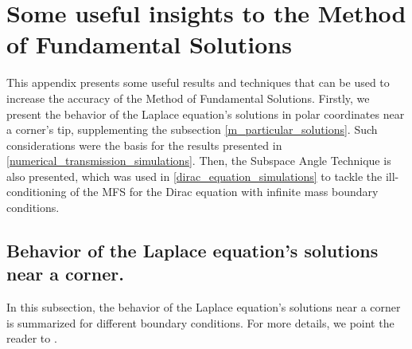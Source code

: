 \chapter{Some useful insights to the Method of Fundamental Solutions}
\label{chapter:appendixB}

This appendix presents some useful results and techniques that can be used to increase the accuracy of the Method of Fundamental Solutions. Firstly, we present the behavior of the Laplace equation's solutions in polar coordinates near a corner's tip, supplementing the subsection \ref{m_particular_solutions}. Such considerations were the basis for the results presented in \ref{numerical_transmission_simulations}. Then, the Subspace Angle Technique is also presented, which was used in \ref{dirac_equation_simulations} to tackle the ill-conditioning of the \ac{MFS} for the Dirac equation with infinite mass boundary conditions.

\section{Behavior of the Laplace equation's solutions near a corner.}\label{appendixB_corners}


In this subsection, the behavior of the Laplace equation's solutions near a corner is summarized for different boundary conditions. For more details, we point the reader to \cite{li2000singularities}.

